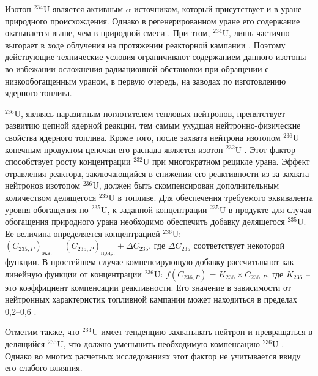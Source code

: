 Изотоп $^{234}$U является активным $\alpha$-источником, который присутствует и в уране природного происхождения. Однако в регенерированном уране его содержание оказывается выше, чем в природной смеси \cite{matveevUran232EgoVliyanie1985,kryuchkovObogashchennyyUranDobavleniem2007}. При этом, $^{234}$U, лишь частично выгорает в ходе облучения на протяжении реакторной кампании \cite{gresleyEnrichingRecyclingUranium1988}. Поэтому действующие технические условия ограничивают содержанием данного изотопы во избежании осложнения радиационной обстановки при обращении с низкообогащенным ураном, в первую очередь, на заводах по изготовлению ядерного топлива.

$^{236}$U, являясь паразитным поглотителем тепловых нейтронов, препятствует развитию цепной ядерной реакции, тем самым ухудшая нейтронно-физические свойства ядерного топлива. Кроме того, после захвата нейтрона изотопом  $^{236}$U конечным продуктом цепочки его распада является изотоп  $^{232}$U \cite{ksenofontovIssledovanieProblemyVovlecheniya1988}. Этот фактор способствует росту концентрации $^{232}$U при многократном рецикле урана. 
Эффект отравления реактора, заключающийся в снижении его реактивности из-за захвата нейтронов изотопом  $^{236}$U, должен быть скомпенсирован дополнительным количеством делящегося $^{235}$U в топливе. Для обеспечения требуемого эквивалента уровня обогащения по $^{235}$U, к заданной концентрации $^{235}$U в продукте для случая обогащения природного урана необходимо обеспечить добавку делящегося $^{235}$U.
Ее величина определяется концентрацией $^{236}$U:
$(C_{235,P})_\textit{экв.}=(C_{235,P})_\textit{прир.}+\Delta C_{235}$, где $\Delta C_{235}$ соответствует некоторой функции. В простейшем случае компенсирующую добавку рассчитывают как линейную функции от концентрации $^{236}$U: $f(C_{236,P})=K_{236} \times C_{236,P}$, где $K_{236}$ -- это коэффициент компенсации реактивности. Его значение в зависимости от нейтронных характеристик топливной кампании может находиться в пределах 0,2--0,6 \cite{delagarzaMulticomponentIsotopeSeparation1961, borodynyaIssledovanieProblemyVovlecheniya1989,delculAnalysisReuseUranium2009}.


Отметим также, что $^{234}$U имеет тенденцию захватывать нейтрон и превращаться в делящийся $^{235}$U, что должно уменьшить необходимую компенсацию $^{236}$U \cite{dyachenkoIspolzovanieRegenerirovannogoUrana2012}. Однако во многих расчетных исследованиях этот фактор не учитывается ввиду его слабого влияния.



